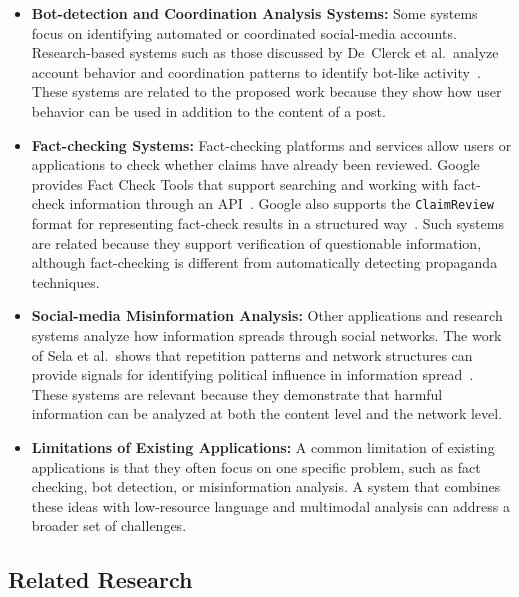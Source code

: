 \begin{itemize}
  \item \textbf{Bot-detection and Coordination Analysis Systems:} Some systems
        focus on identifying automated or coordinated social-media accounts.
        Research-based systems such as those discussed by De~Clerck et al.\ analyze
        account behavior and coordination patterns to identify bot-like
        activity~\cite{declerck2024}. These systems are related to the proposed work
        because they show how user behavior can be used in addition to the content
        of a post.
  \item \textbf{Fact-checking Systems:} Fact-checking platforms and services allow
        users or applications to check whether claims have already been reviewed.
        Google provides Fact Check Tools that support searching and working with
        fact-check information through an API~\cite{google_factcheck}. Google also
        supports the \texttt{ClaimReview} format for representing fact-check
        results in a structured way~\cite{google_claimreview}. Such systems are
        related because they support verification of questionable information,
        although fact-checking is different from automatically detecting
        propaganda techniques.
  \item \textbf{Social-media Misinformation Analysis:} Other applications and
        research systems analyze how information spreads through social networks.
        The work of Sela et al.\ shows that repetition patterns and network
        structures can provide signals for identifying political influence in
        information spread~\cite{sela2025}. These systems are relevant because they
        demonstrate that harmful information can be analyzed at both the content
        level and the network level.
  \item \textbf{Limitations of Existing Applications:} A common limitation of
        existing applications is that they often focus on one specific problem,
        such as fact checking, bot detection, or misinformation analysis. A system
        that combines these ideas with low-resource language and multimodal
        analysis can address a broader set of challenges.
\end{itemize}

\subsection{Related Research}

